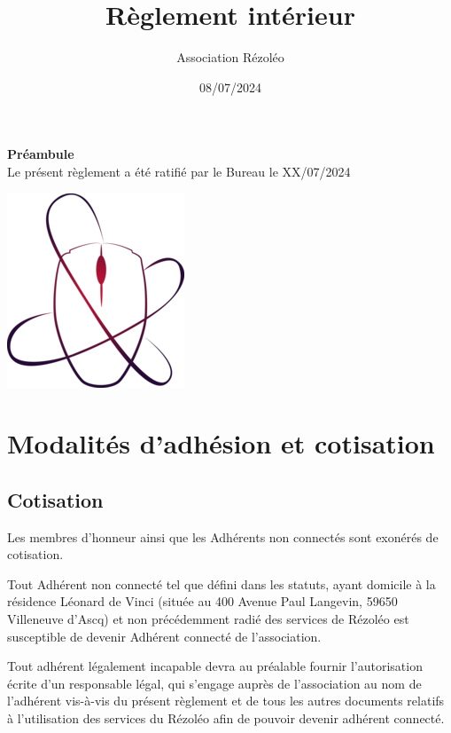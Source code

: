 \documentclass[12pt, a4paper]{article}
\begin{document}
	\title{Règlement intérieur}
	\author{Association Rézoléo}
	\date{08/07/2024}
	\maketitle

    \begin{center}
	   \textbf{Préambule}\\
          Le présent règlement a été ratifié par le Bureau le XX/07/2024

        \vspace{3cm}
        \includegraphics[scale=2]{rezoleo_logo.png}
          
    \end{center}

	\newpage

	\tableofcontents

	\newpage

	\section{Modalités d'adhésion et cotisation}

	\subsection{Cotisation}

	Les membres d'honneur ainsi que les Adhérents non connectés sont exonérés de cotisation.

	\bigskip

	Tout Adhérent non connecté tel que défini dans les statuts, ayant domicile à la
	résidence Léonard de Vinci (située au 400 Avenue Paul Langevin, 59650
	Villeneuve d'Ascq) et non précédemment radié des services de Rézoléo est
	susceptible de devenir Adhérent connecté de l'association.

	\bigskip

	Tout adhérent légalement incapable devra au préalable fournir l'autorisation écrite
	d'un responsable légal, qui s'engage auprès de l'association au nom de l'adhérent
	vis-à-vis du présent règlement et de tous les autres documents relatifs à l'utilisation
	des services du Rézoléo afin de pouvoir devenir adhérent connecté.
\end{document}
